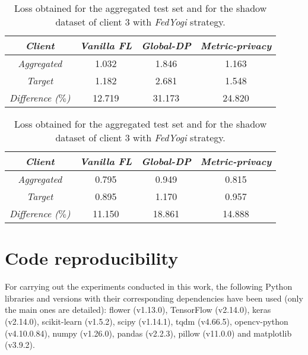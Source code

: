 \documentclass[5p,times]{elsarticle}
\begin{document}
\begin{table}[ht]
    \centering
    \begin{minipage}[t]{0.45\textwidth}
    \centering
    \begin{tabular}{cccc}
    \toprule
         \textit{\textbf{Client}} & \textit{\textbf{Vanilla FL}} & \textit{\textbf{Global-DP}} & \textit{\textbf{Metric-privacy}} \\
         \midrule
         \textit{Aggregated} & 1.032 & 1.846 & 1.163 \\ 
         \textit{Target}  & 1.182 & 2.681 & 1.548 \\ 
         \midrule
         \textit{Difference ($\%$)} & 12.719 & 31.173 & 24.820 \\ 
    \bottomrule
    \end{tabular}
    \caption{Loss obtained for the aggregated test set and for the shadow dataset of client 3 with \textit{FedProx} strategy.}
    \label{tab:ciattacks_example_fedprox}
    \end{minipage}
    \hspace{0.05\textwidth} 
    \begin{minipage}[t]{0.45\textwidth}
    \centering
    \begin{tabular}{cccc}
    \toprule
         \textit{\textbf{Client}} & \textit{\textbf{Vanilla FL}} & \textit{\textbf{Global-DP}} & \textit{\textbf{Metric-privacy}} \\
         \midrule
         \textit{Aggregated} & 0.795 & 0.949 & 0.815 \\ 
         \textit{Target}  & 0.895 & 1.170 & 0.957 \\ 
         \midrule
         \textit{Difference ($\%$)} & 11.150 & 18.861 & 14.888 \\ 
    \bottomrule
    \end{tabular}
    \caption{Loss obtained for the aggregated test set and for the shadow dataset of client 3 with \textit{FedYogi} strategy.}
    \label{tab:ciattacks_example_fedyogi}
    \end{minipage}
\end{table}

\section{Code reproducibility}\label{sec:software}

For carrying out the experiments conducted in this work, the following Python libraries and versions with their corresponding dependencies have been used (only the main ones are detailed): flower (v1.13.0), TensorFlow (v2.14.0), keras (v2.14.0),  scikit-learn (v1.5.2), scipy (v1.14.1), tqdm (v4.66.5), opencv-python (v4.10.0.84), numpy (v1.26.0), pandas (v2.2.3), pillow (v11.0.0) and matplotlib (v3.9.2). 
\end{document}
